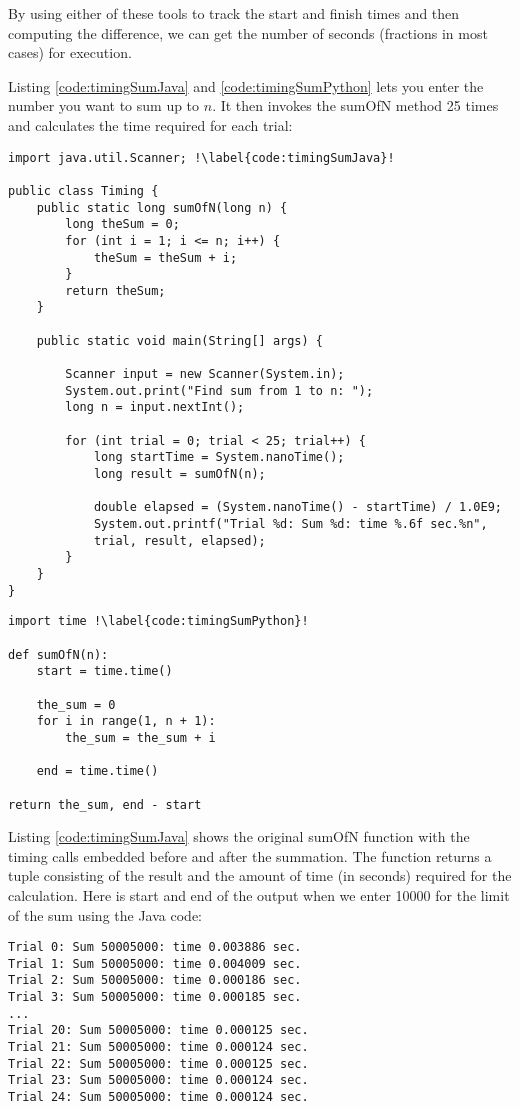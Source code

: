 By using either of these tools to track the start and finish times and then computing the difference, we can get the number of seconds (fractions in most cases) for execution.

Listing \ref{code:timingSumJava} and \ref{code:timingSumPython} lets you enter the number you want to sum up to $n$. It then invokes the sumOfN method 25 times and calculates the time required for each trial:

\begin{verbatim}
import java.util.Scanner; !\label{code:timingSumJava}!

public class Timing {
	public static long sumOfN(long n) {
		long theSum = 0;
		for (int i = 1; i <= n; i++) {
			theSum = theSum + i;
		}
		return theSum;
	}
	
	public static void main(String[] args) {
		
		Scanner input = new Scanner(System.in);
		System.out.print("Find sum from 1 to n: ");
		long n = input.nextInt();
		
		for (int trial = 0; trial < 25; trial++) {
			long startTime = System.nanoTime();
			long result = sumOfN(n);
			
			double elapsed = (System.nanoTime() - startTime) / 1.0E9;
			System.out.printf("Trial %d: Sum %d: time %.6f sec.%n",
			trial, result, elapsed);
		}
	}
}
\end{verbatim}


\begin{verbatim}
import time !\label{code:timingSumPython}!

def sumOfN(n):
	start = time.time()
	
	the_sum = 0
	for i in range(1, n + 1):
		the_sum = the_sum + i
		
	end = time.time()

return the_sum, end - start

\end{verbatim}

Listing \ref{code:timingSumJava} shows the original sumOfN function with the timing calls embedded before and after the summation. The function returns a tuple consisting of the result and the amount of time (in seconds) required for the calculation. Here is start and end of the output when we enter 10000 for the limit of the sum using the Java code:

\begin{verbatim}
Trial 0: Sum 50005000: time 0.003886 sec.
Trial 1: Sum 50005000: time 0.004009 sec.
Trial 2: Sum 50005000: time 0.000186 sec.
Trial 3: Sum 50005000: time 0.000185 sec.
...
Trial 20: Sum 50005000: time 0.000125 sec.
Trial 21: Sum 50005000: time 0.000124 sec.
Trial 22: Sum 50005000: time 0.000125 sec.
Trial 23: Sum 50005000: time 0.000124 sec.
Trial 24: Sum 50005000: time 0.000124 sec.
\end{verbatim}


